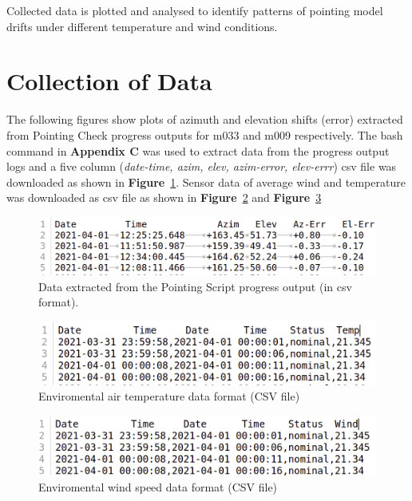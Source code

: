 \documentclass{article}
\begin{document}
Collected data is plotted and analysed to identify patterns of pointing model drifts under different temperature and wind conditions.     


\section{Collection of Data}
The following figures show plots of azimuth and elevation shifts (error) extracted from Pointing Check progress outputs for m033 and m009 respectively.  The bash command in \textbf{Appendix C} was used to extract data from the progress output logs and a five column (\textit{date-time, azim, elev, azim-error, elev-errr}) csv file was downloaded as shown in \textbf{Figure}~\ref{fig:data2}.  Sensor data of average wind and temperature  was downloaded as csv file as shown in \textbf{Figure}~\ref{fig:temp2} and \textbf{Figure}~\ref{fig:wind3} 

\begin{figure}[H]
	\includegraphics[scale=0.42]{data2.png}
	
	\caption{Data extracted from the Pointing Script progress output (in csv format).}
	\label{fig:data2}
\end{figure}

\begin{figure}[H]
	\includegraphics[scale=0.42]{temp2.png}
	
	\caption{Enviromental air temperature data format (CSV file)}
	\label{fig:temp2}
\end{figure}
\begin{figure}[H]
	\includegraphics[scale=0.43]{wind3.png}
	
	\caption{Enviromental wind speed data format (CSV file)}
	\label{fig:wind3}
\end{figure}
\end{document}
